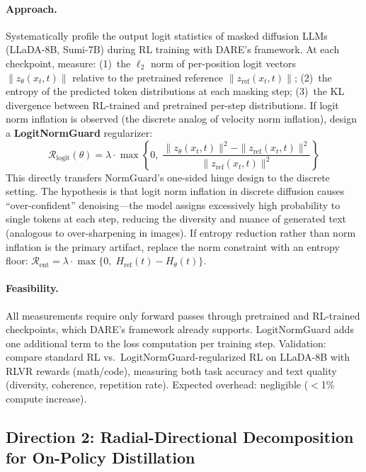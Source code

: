 \documentclass[11pt,a4paper]{article}
\begin{document}
\paragraph{Approach.} Systematically profile the output logit statistics of masked diffusion LLMs (LLaDA-8B, Sumi-7B) during RL training with DARE's framework. At each checkpoint, measure: (1)~the $\ell_2$ norm of per-position logit vectors $\|z_\theta(x_t, t)\|$ relative to the pretrained reference $\|z_{\mathrm{ref}}(x_t,t)\|$; (2)~the entropy of the predicted token distributions at each masking step; (3)~the KL divergence between RL-trained and pretrained per-step distributions. If logit norm inflation is observed (the discrete analog of velocity norm inflation), design a \textbf{LogitNormGuard} regularizer:
\begin{equation}
\mathcal{R}_{\mathrm{logit}}(\theta) = \lambda \cdot \max\!\left\{0,\;\frac{\|z_\theta(x_t,t)\|^2 - \|z_{\mathrm{ref}}(x_t,t)\|^2}{\|z_{\mathrm{ref}}(x_t,t)\|^2}\right\}
\end{equation}
This directly transfers NormGuard's one-sided hinge design to the discrete setting. The hypothesis is that logit norm inflation in discrete diffusion causes ``over-confident'' denoising---the model assigns excessively high probability to single tokens at each step, reducing the diversity and nuance of generated text (analogous to over-sharpening in images). If entropy reduction rather than norm inflation is the primary artifact, replace the norm constraint with an entropy floor: $\mathcal{R}_{\mathrm{ent}} = \lambda \cdot \max\{0,\; H_{\mathrm{ref}}(t) - H_\theta(t)\}$.

\paragraph{Feasibility.} All measurements require only forward passes through pretrained and RL-trained checkpoints, which DARE's framework already supports. LogitNormGuard adds one additional term to the loss computation per training step. Validation: compare standard RL vs.\ LogitNormGuard-regularized RL on LLaDA-8B with RLVR rewards (math/code), measuring both task accuracy and text quality (diversity, coherence, repetition rate). Expected overhead: negligible ($<$1\% compute increase).

\subsection{Direction 2: Radial-Directional Decomposition for On-Policy Distillation}
\end{document}
